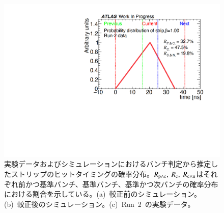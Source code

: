 \begin{figure}[tbp]
\begin{minipage}{0.33\hsize}
    \subcaption{}
    \end{minipage}
    \begin{minipage}{0.33\hsize}
    \centering   
    \includegraphics[width=\textwidth,page=1]{img/rec/rec_data_s.pdf}
    \subcaption{}
    \end{minipage} 
    \caption[実験データおよびシミュレーションにおけるバンチ判定から推定したストリップのヒットタイミングの確率分布]{実験データおよびシミュレーションにおけるバンチ判定から推定したストリップのヒットタイミングの確率分布。$R_{\rm{p{\land}c}},~R_{\rm{c}},~R_{\rm{c{\land}n}}$はそれぞれ前かつ基準バンチ、基準バンチ、基準かつ次バンチの確率分布における割合を示している。(a)~較正前のシミュレーション。(b)~較正後のシミュレーション。(c)~Run~2~の実験データ。}\label{fig:recall1}
\end{figure}

